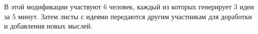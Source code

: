В этой модификации участвуют 6 человек, каждый из которых генерирует 3 идеи за 5 минут. Затем листы с идеями передаются другим участникам для доработки и добавления новых мыслей.

